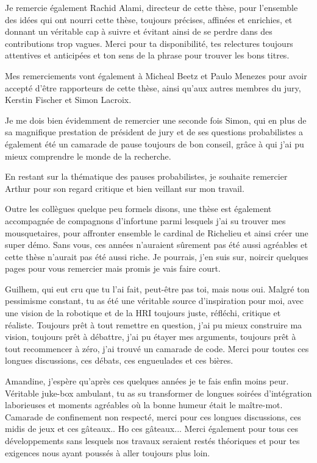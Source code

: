 \documentclass[english,a4paper,11pt,twoside]{StyleThese}
\begin{document}
Je remercie également Rachid Alami, directeur de cette thèse, pour l'ensemble des idées qui ont nourri cette thèse, toujours précises, affinées et enrichies, et donnant un véritable cap à suivre et évitant ainsi de se perdre dans des contributions trop vagues. Merci pour ta disponibilité, tes relectures toujours attentives et anticipées et ton sens de la phrase pour trouver les bons titres.

Mes remerciements vont également à Micheal Beetz et Paulo Menezes pour avoir accepté d'être rapporteurs de cette thèse, ainsi qu'aux autres membres du jury, Kerstin Fischer et Simon Lacroix.

Je me dois bien évidemment de remercier une seconde fois Simon, qui en plus de sa magnifique prestation de président de jury et de ses questions probabilistes a également été un camarade de pause toujours de bon conseil, grâce à qui j'ai pu mieux comprendre le monde de la recherche.

En restant sur la thématique des pauses probabilistes, je souhaite remercier Arthur pour son regard critique et bien veillant sur mon travail.

Outre les collègues quelque peu formels disons, une thèse est également accompagnée de compagnons d'infortune parmi lesquels j'ai su trouver mes mousquetaires, pour affronter ensemble le cardinal de Richelieu et ainsi créer une super démo. Sans vous, ces années n'auraient sûrement pas été aussi agréables et cette thèse n'aurait pas été aussi riche. Je pourrais, j'en suis sur, noircir quelques pages pour vous remercier mais promis je vais faire court.

Guilhem, qui eut cru que tu l'ai fait, peut-être pas toi, mais nous oui. Malgré ton pessimisme constant, tu as été une véritable source d'inspiration pour moi, avec une vision de la robotique et de la HRI toujours juste, réfléchi, critique et réaliste. Toujours prêt à tout remettre en question, j'ai pu mieux construire ma vision, toujours prêt à débattre, j'ai pu étayer mes arguments, toujours prêt à tout recommencer à zéro, j'ai trouvé un camarade de code. Merci pour toutes ces longues discussions, ces débats, ces engueulades et ces bières.

Amandine, j'espère qu'après ces quelques années je te fais enfin moins peur. Véritable juke-box ambulant, tu as su transformer de longues soirées d'intégration laborieuses et moments agréables où la bonne humeur était le maître-mot. Camarade de confinement non respecté, merci pour ces longues discussions, ces midis de jeux et ces gâteaux.. Ho ces gâteaux... Merci également pour tous ces développements sans lesquels nos travaux seraient restés théoriques et pour tes exigences nous ayant poussés à aller toujours plus loin.
\end{document}
